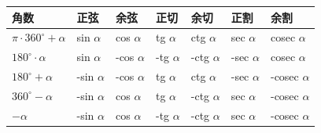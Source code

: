 {\def\LTcaptype{none} %
\begin{longtable}[]{@{}
  >{\raggedright\arraybackslash}p{}
  >{\raggedright\arraybackslash}p{}
  >{\raggedright\arraybackslash}p{}
  >{\raggedright\arraybackslash}p{}
  >{\raggedright\arraybackslash}p{}
  >{\raggedright\arraybackslash}p{}
  >{\raggedright\arraybackslash}p{}@{}}
\toprule\noalign{}
\begin{minipage}[b]{\linewidth}\raggedright
角数
\end{minipage} & \begin{minipage}[b]{\linewidth}\raggedright
正弦
\end{minipage} & \begin{minipage}[b]{\linewidth}\raggedright
余弦
\end{minipage} & \begin{minipage}[b]{\linewidth}\raggedright
正切
\end{minipage} & \begin{minipage}[b]{\linewidth}\raggedright
余切
\end{minipage} & \begin{minipage}[b]{\linewidth}\raggedright
正割
\end{minipage} & \begin{minipage}[b]{\linewidth}\raggedright
余割
\end{minipage} \\
\midrule\noalign{}
\endhead
\bottomrule\noalign{}
\endlastfoot
\(\pi \cdot 360^{\circ} + \alpha\) & sin \(\alpha\) & cos \(\alpha\) &
tg \(\alpha\) & ctg \(\alpha\) & sec \(\alpha\) & cosec \(\alpha\) \\
\(180^{\circ} \cdot \alpha\) & sin \(\alpha\) & -cos \(\alpha\) & -tg
\(\alpha\) & -ctg \(\alpha\) & -sec \(\alpha\) & cosec \(\alpha\) \\
\(180^{\circ} + \alpha\) & -sin \(\alpha\) & -cos \(\alpha\) & tg
\(\alpha\) & ctg \(\alpha\) & -sec \(\alpha\) & -cosec \(\alpha\) \\
\(360^{\circ} - \alpha\) & -sin \(\alpha\) & cos \(\alpha\) & tg
\(\alpha\) & -ctg \(\alpha\) & sec \(\alpha\) & -cosec \(\alpha\) \\
\(-\alpha\) & -sin \(\alpha\) & cos \(\alpha\) & -tg \(\alpha\) & -ctg
\(\alpha\) & sec \(\alpha\) & -cosec \(\alpha\) \\
\end{longtable}
}

